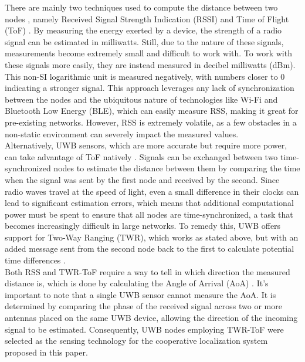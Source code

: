 \noindent There are mainly two techniques used to compute the distance between two nodes \cite{wirelesssensornetworklocalizationtechniques}, namely Received Signal Strength Indication (RSSI) \cite{CollaborativeLocalizationWithReceivedSignalStrengthinWirelesSensorNetworks} and Time of Flight (ToF) \cite{RadioFrequencyTimeofFlightDistanceMeasurementforLowCostWirelessSensorLocalization}. By measuring the energy exerted by a device, the strength of a radio signal can be estimated in milliwatts. Still, due to the nature of these signals, measurements become extremely small and difficult to work with. To work with these signals more easily, they are instead measured in decibel milliwatts (dBm). This non-SI logarithmic unit is measured negatively, with numbers closer to 0 indicating a stronger signal. This approach leverages any lack of synchronization between the nodes and the ubiquitous nature of technologies like Wi-Fi and Bluetooth Low Energy (BLE), which can easily measure RSS, making it great for pre-existing networks. However, RSS is extremely volatile, as a few obstacles in a non-static environment can severely impact the measured values.\\

\noindent Alternatively, UWB sensors, which are more accurate but require more power, can take advantage of ToF natively \cite{OnperformancestudyofUWBrealtimelocatingsystem}. Signals can be exchanged between two time-synchronized nodes to estimate the distance between them by comparing the time when the signal was sent by the first node and received by the second. Since radio waves travel at the speed of light, even a small difference in their clocks can lead to significant estimation errors, which means that additional computational power must be spent to ensure that all nodes are time-synchronized, a task that becomes increasingly difficult in large networks. To remedy this, UWB offers support for Two-Way Ranging (TWR), which works as stated above, but with an added message sent from the second node back to the first to calculate potential time differences \cite{Real-TimeAnchorNodeSelectionforTwo-Way-Ranging(TWR)Ultra-Wideband(UWB)IndoorPositioningSystems}.\\

\noindent Both RSS and TWR-ToF require a way to tell in which direction the measured distance is, which is done by calculating the Angle of Arrival (AoA) \cite{AnguLoc}. It’s important to note that a single UWB sensor cannot measure the AoA. It is determined by comparing the phase of the received signal across two or more antennas placed on the same UWB device, allowing the direction of the incoming signal to be estimated. Consequently, UWB nodes employing TWR-ToF were selected as the sensing technology for the cooperative localization system proposed in this paper.\\

